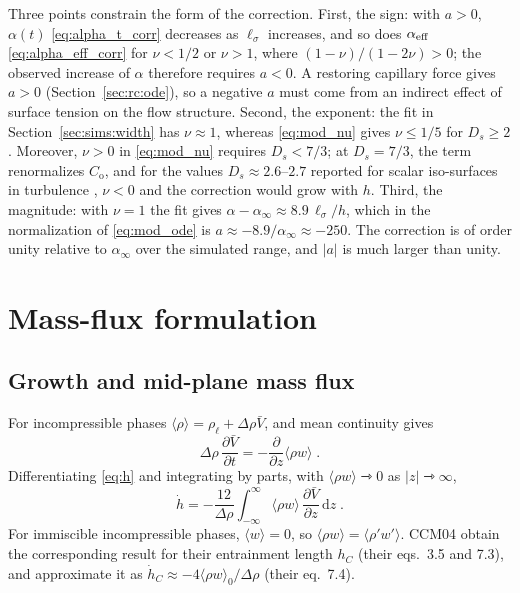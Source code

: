 \documentclass[11pt]{article}
\numberwithin{equation}{section}
\newcommand{\avg}[1]{\langle #1\rangle}
\newcommand{\ls}{\ell_\sigma}
\newcommand{\hd}{\dot h}
\newcommand{\pd}[2]{\frac{\partial #1}{\partial #2}}
\begin{document}
Three points constrain the form of the correction. First, the sign: with $a > 0$, $\alpha(t)$ \eqref{eq:alpha_t_corr} decreases as $\ls$ increases, and so does $\alpha_{\rm eff}$ \eqref{eq:alpha_eff_corr} for $\nu < 1/2$ or $\nu > 1$, where $(1 - \nu)/(1 - 2 \nu) > 0$; the observed increase of $\alpha$ therefore requires $a < 0$. A restoring capillary force gives $a > 0$ (Section~\ref{sec:rc:ode}), so a negative $a$ must come from an indirect effect of surface tension on the flow structure. Second, the exponent: the fit in Section~\ref{sec:sims:width} has $\nu \approx 1$, whereas \eqref{eq:mod_nu} gives $\nu \le 1/5$ for $D_s \ge 2$. Moreover, $\nu > 0$ in \eqref{eq:mod_nu} requires $D_s < 7/3$; at $D_s = 7/3$, the term renormalizes $C_\mathrm{o}$, and for the values $D_s \approx 2.6$--$2.7$ reported for scalar iso-surfaces in turbulence \cite{Sreenivasan1991}, $\nu < 0$ and the correction would grow with $h$. Third, the magnitude: with $\nu = 1$ the fit gives $\alpha - \alpha_\infty \approx 8.9 \, \ls/h$, which in the normalization of \eqref{eq:mod_ode} is $a \approx -8.9/\alpha_\infty \approx -250$. The correction is of order unity relative to $\alpha_\infty$ over the simulated range, and $|a|$ is much larger than unity.

\section{Mass-flux formulation}\label{sec:cook}

\subsection{Growth and mid-plane mass flux}\label{sec:cook:flux}
For incompressible phases $\avg\rho = \rho_\ell + \Delta \rho \bar V$, and mean continuity gives
\begin{equation}\label{eq:continuity}
\Delta \rho \, \pd{\bar V}{t} = -\pd{}{z} \avg{\rho w} \;.
\end{equation}
Differentiating \eqref{eq:h} and integrating by parts, with $\avg{\rho w} \rightarrowtriangle 0$ as $| z | \rightarrowtriangle \infty$,
\begin{equation}\label{eq:hdot_flux}
\hd = -\frac{12}{\Delta \rho} \int_{-\infty}^{\infty} \avg{\rho w} \, \pd{\bar V}{z} \, \mathrm d z \;.
\end{equation}
For immiscible incompressible phases, $\avg w = 0$, so $\avg{\rho w} = \avg{\rho' w'}$. CCM04 obtain the corresponding result for their entrainment length $h_C$ (their eqs.~3.5 and 7.3), and approximate it as $\hd_C \approx -4 \avg{\rho w}_0/\Delta \rho$ (their eq.~7.4).
\end{document}
